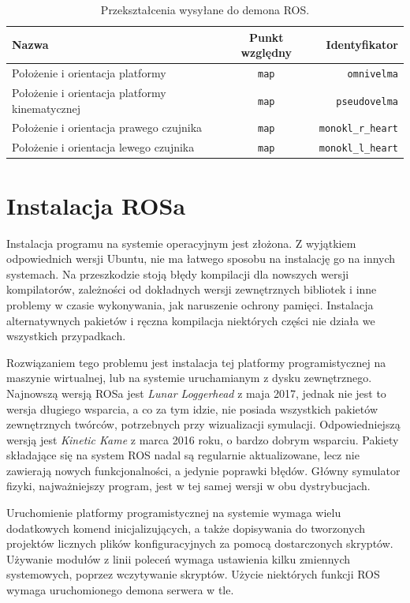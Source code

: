 	\begin{table}
		\centering
		\begin{tabular}{l c r}
			Nazwa & Punkt względny & Identyfikator \\
			\hline
			Położenie i orientacja platformy & \texttt{map} & \texttt{omnivelma} \\
			Położenie i orientacja platformy kinematycznej & \texttt{map} & \texttt{pseudovelma} \\
			Położenie i orientacja prawego czujnika & \texttt{map} & \texttt{monokl\_r\_heart} \\
			Położenie i orientacja lewego czujnika & \texttt{map} & \texttt{monokl\_l\_heart} \\
		\end{tabular}
		\caption{Przekształcenia wysyłane do demona ROS.}
		\label{tab:frame_send}
	\end{table}
			
\section{Instalacja ROSa}
	Instalacja programu na systemie operacyjnym jest złożona.
	Z wyjątkiem odpowiednich wersji Ubuntu, nie ma łatwego sposobu na instalację go na innych systemach.
	Na przeszkodzie stoją błędy kompilacji dla nowszych wersji kompilatorów, zależności od dokładnych wersji zewnętrznych bibliotek i 
	inne problemy w czasie wykonywania, jak naruszenie ochrony pamięci. 
	Instalacja alternatywnych pakietów i ręczna kompilacja niektórych części nie działa we wszystkich przypadkach.

	Rozwiązaniem tego problemu jest instalacja tej platformy programistycznej na maszynie wirtualnej, lub na systemie uruchamianym z dysku zewnętrznego. 
	Najnowszą wersją ROSa jest \emph{Lunar Loggerhead} z maja 2017, jednak nie jest to wersja długiego wsparcia, a co za tym idzie, nie posiada wszystkich
	pakietów zewnętrznych twórców, potrzebnych przy wizualizacji symulacji.
	Odpowiedniejszą wersją jest \emph{Kinetic Kame} z marca 2016 roku, o bardzo dobrym wsparciu.
	Pakiety składające się na system ROS nadal są regularnie aktualizowane, lecz nie zawierają nowych funkcjonalności, a jedynie poprawki błędów.
	Główny symulator fizyki, najważniejszy program, jest w tej samej wersji w obu dystrybucjach.

	Uruchomienie platformy programistycznej na systemie wymaga wielu dodatkowych komend inicjalizujących, 
	a także dopisywania do tworzonych projektów licznych plików konfiguracyjnych za pomocą dostarczonych skryptów.
	Używanie modułów z linii poleceń wymaga ustawienia kilku zmiennych systemowych, poprzez wczytywanie skryptów.
	Użycie niektórych funkcji ROS wymaga uruchomionego demona serwera w tle.

